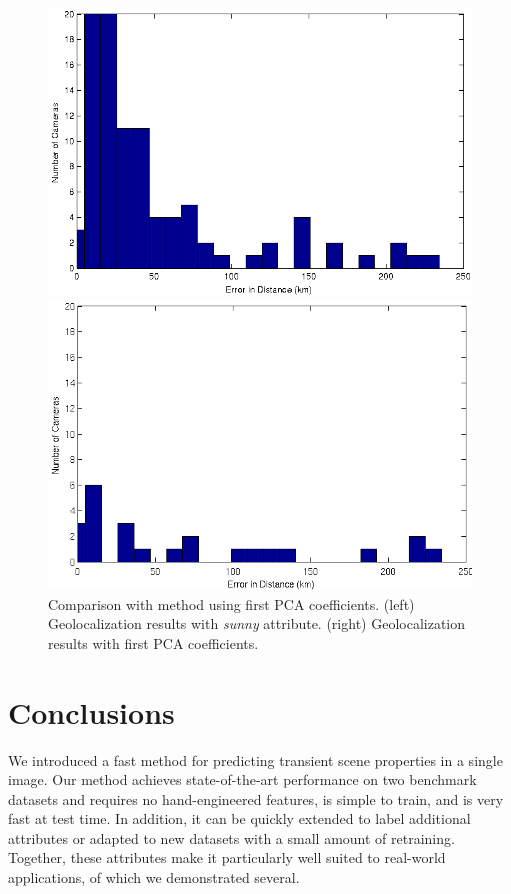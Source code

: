 \documentclass[10pt,twocolumn,letterpaper]{article}
\begin{document}
\begin{figure}
  \centering
  \includegraphics[width=.9\linewidth]{figs/geoloc/tran_errors}

  \includegraphics[width=.9\linewidth]{figs/geoloc/pca_errors}
  \caption{Comparison with method using first PCA coefficients. (left)
    Geolocalization results with \textit{sunny} attribute. (right)
    Geolocalization results with first PCA coefficients.}
  \label{fig:locerror}
\end{figure}

\section{Conclusions}

We introduced a fast method for predicting transient scene properties
in a single image. Our method achieves state-of-the-art performance on
two benchmark datasets and requires no hand-engineered features, is
simple to train, and is very fast at test time. In addition, it can be
quickly extended to label additional attributes or adapted to new
datasets with a small amount of retraining. Together, these attributes
make it particularly well suited to real-world applications, of which
we demonstrated several.
\end{document}
